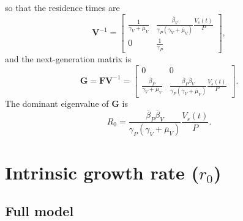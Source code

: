 \documentclass{article}
\newcommand{\mat}[1]{\mathbf{#1}}
\begin{document}
so that the residence times are
\begin{equation}
  \mat{V}^{-1} =
  \begin{bmatrix}
    \frac{1}{\gamma_V + \overline{\mu}_V}
    & \frac{\overline{\beta}_V}
    {\gamma_P \left(\gamma_V + \overline{\mu}_V\right)}
    \frac{V_s(t)}{P}
    \\
    0 & \frac{1}{\gamma_P}
  \end{bmatrix},
\end{equation}
and the next-generation matrix is
\begin{equation}
  \mat{G} = \mat{F} \mat{V}^{-1}
  =
  \begin{bmatrix}
    0 & 0
    \\
    \frac{\overline{\beta}_P}{\gamma_V + \overline{\mu}_V}
    &
    \frac{\overline{\beta}_P \overline{\beta}_V}
    {\gamma_P \left(\gamma_V + \overline{\mu}_V\right)}
    \frac{V_s(t)}{P}
  \end{bmatrix}.
\end{equation}
The dominant eigenvalue of $\mat{G}$ is
\begin{equation}
  \label{R0QSSA}
  R_0 =
  \frac{\overline{\beta}_P \overline{\beta}_V}
  {\gamma_P \left(\gamma_V + \overline{\mu}_V\right)}
  \frac{V_s(t)}{P}.
\end{equation}


\section{Intrinsic growth rate ($r_0$)}

\subsection{Full model}
\end{document}
